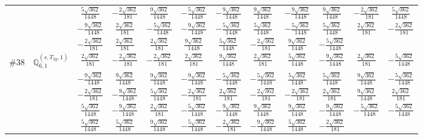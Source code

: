 \documentclass[fleqn,9pt,landscape]{jsarticle}
\begin{document}
\begin{center}
\begin{longtable}{lcccccccccc}
& $ \frac{5 \sqrt{362}}{1448} $ & $ - \frac{2 \sqrt{362}}{181} $ & $ \frac{9 \sqrt{362}}{1448} $ & $ - \frac{5 \sqrt{362}}{1448} $ & $ - \frac{9 \sqrt{362}}{1448} $ & $ \frac{9 \sqrt{362}}{1448} $ & $ - \frac{9 \sqrt{362}}{1448} $ & $ \frac{9 \sqrt{362}}{1448} $ & $ - \frac{2 \sqrt{362}}{181} $ & $ \frac{5 \sqrt{362}}{1448} $ \\
& $ - \frac{9 \sqrt{362}}{1448} $ & $ \frac{2 \sqrt{362}}{181} $ & $ - \frac{5 \sqrt{362}}{1448} $ & $ - \frac{9 \sqrt{362}}{1448} $ & $ - \frac{5 \sqrt{362}}{1448} $ & $ \frac{5 \sqrt{362}}{1448} $ & $ - \frac{5 \sqrt{362}}{1448} $ & $ \frac{5 \sqrt{362}}{1448} $ & $ \frac{2 \sqrt{362}}{181} $ & $ - \frac{2 \sqrt{362}}{181} $ \\
& $ - \frac{2 \sqrt{362}}{181} $ & $ \frac{2 \sqrt{362}}{181} $ & $ \frac{2 \sqrt{362}}{181} $ & $ \frac{9 \sqrt{362}}{1448} $ & $ \frac{5 \sqrt{362}}{1448} $ & $ - \frac{2 \sqrt{362}}{181} $ & $ \frac{9 \sqrt{362}}{1448} $ & $ - \frac{5 \sqrt{362}}{1448} $ & $  $ & $  $ \\ \hline
$ \#38\quad \mathbb{Q}_{6,1}^{(s,T_{2g},1)} $ & $ \frac{2 \sqrt{362}}{181} $ & $ - \frac{2 \sqrt{362}}{181} $ & $ - \frac{2 \sqrt{362}}{181} $ & $ \frac{2 \sqrt{362}}{181} $ & $ \frac{9 \sqrt{362}}{1448} $ & $ \frac{2 \sqrt{362}}{181} $ & $ \frac{5 \sqrt{362}}{1448} $ & $ - \frac{9 \sqrt{362}}{1448} $ & $ \frac{2 \sqrt{362}}{181} $ & $ - \frac{5 \sqrt{362}}{1448} $ \\
& $ - \frac{9 \sqrt{362}}{1448} $ & $ \frac{9 \sqrt{362}}{1448} $ & $ \frac{9 \sqrt{362}}{1448} $ & $ - \frac{9 \sqrt{362}}{1448} $ & $ - \frac{5 \sqrt{362}}{1448} $ & $ - \frac{5 \sqrt{362}}{1448} $ & $ \frac{5 \sqrt{362}}{1448} $ & $ \frac{5 \sqrt{362}}{1448} $ & $ \frac{9 \sqrt{362}}{1448} $ & $ - \frac{5 \sqrt{362}}{1448} $ \\
& $ - \frac{2 \sqrt{362}}{181} $ & $ - \frac{9 \sqrt{362}}{1448} $ & $ \frac{5 \sqrt{362}}{1448} $ & $ - \frac{2 \sqrt{362}}{181} $ & $ \frac{2 \sqrt{362}}{181} $ & $ - \frac{2 \sqrt{362}}{181} $ & $ - \frac{2 \sqrt{362}}{181} $ & $ \frac{2 \sqrt{362}}{181} $ & $ \frac{9 \sqrt{362}}{1448} $ & $ \frac{2 \sqrt{362}}{181} $ \\
& $ \frac{5 \sqrt{362}}{1448} $ & $ - \frac{9 \sqrt{362}}{1448} $ & $ \frac{2 \sqrt{362}}{181} $ & $ - \frac{5 \sqrt{362}}{1448} $ & $ - \frac{9 \sqrt{362}}{1448} $ & $ \frac{9 \sqrt{362}}{1448} $ & $ \frac{9 \sqrt{362}}{1448} $ & $ - \frac{9 \sqrt{362}}{1448} $ & $ - \frac{5 \sqrt{362}}{1448} $ & $ - \frac{5 \sqrt{362}}{1448} $ \\
& $ \frac{5 \sqrt{362}}{1448} $ & $ \frac{5 \sqrt{362}}{1448} $ & $ \frac{9 \sqrt{362}}{1448} $ & $ - \frac{5 \sqrt{362}}{1448} $ & $ - \frac{2 \sqrt{362}}{181} $ & $ - \frac{9 \sqrt{362}}{1448} $ & $ \frac{5 \sqrt{362}}{1448} $ & $ - \frac{2 \sqrt{362}}{181} $ & $  $ & $  $ \\ \hline

\end{longtable}
\end{center}
\end{document}
